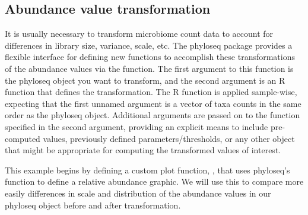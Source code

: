 \subsection*{Abundance value transformation}

It is usually necessary to transform microbiome count data
to account for differences in library size, variance, scale, etc.
The phyloseq package provides a flexible interface for defining
new functions to accomplish these transformations of the abundance values
via the  function.
The first argument to this function is the phyloseq object you want to transform,
and the second argument is an R function that defines the transformation.
The R function is applied sample-wise, expecting that the first unnamed argument
is a vector of taxa counts in the same order as the phyloseq object.
Additional arguments are passed on to the function
specified in the second argument,
providing an explicit means to include
pre-computed values, previously defined parameters/thresholds,
or any other object that might be appropriate
for computing the transformed values of interest.

This example begins by defining a custom plot function,
,
that uses phyloseq's  function
to define a relative abundance graphic.
We will use this to compare more easily differences
in scale and distribution of the abundance values
in our phyloseq object before and after transformation.

